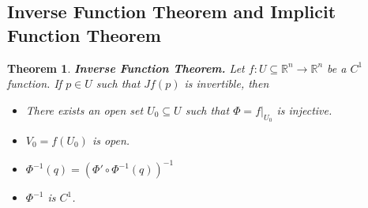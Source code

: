 \documentclass{article}
\theoremstyle{plain} %
\newtheorem{thm}{Theorem}
\numberwithin{thm}{section} %
\theoremstyle{definition}
\begin{document}
    \subsection{Inverse Function Theorem and Implicit Function Theorem}
    \begin{thm}
        \textbf{Inverse Function Theorem.} Let \(f: U \subseteq \mathbb{R}^n \to \mathbb{R}^n\) be a \(C^1\) function. If \(p \in U\) such that \(Jf(p)\) is invertible, then
        \begin{itemize}
            \item There exists an open set \(U_0 \subseteq U\) such that \(\Phi = f | _{U_0}\) is injective.
            \item \(V_0 = f(U_0)\) is open.
            \item \(\Phi ^{-1}(q) = (\Phi ' \circ \Phi^{-1}(q))^{-1}\)
            \item \(\Phi ^{-1}\) is \(C^1\).
        \end{itemize}
    \end{thm}
\end{document}
